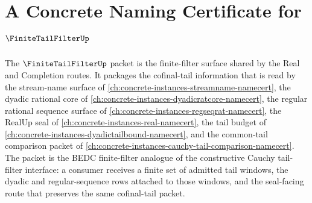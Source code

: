 \chapter{A Concrete Naming Certificate for $\FiniteTailFilterUp$}
\label{ch:concrete-instances-finite-tail-filter-namecert}

The $\FiniteTailFilterUp$ packet is the finite-filter surface shared by the Real and Completion routes. It packages the cofinal-tail information that is read by the stream-name surface of \autoref{ch:concrete-instances-streamname-namecert}, the dyadic rational core of \autoref{ch:concrete-instances-dyadicratcore-namecert}, the regular rational sequence surface of \autoref{ch:concrete-instances-regseqrat-namecert}, the RealUp seal of \autoref{ch:concrete-instances-real-namecert}, the tail budget of \autoref{ch:concrete-instances-dyadictailbound-namecert}, and the common-tail comparison packet of \autoref{ch:concrete-instances-cauchy-tail-comparison-namecert}. The packet is the BEDC finite-filter analogue of the constructive Cauchy tail-filter interface: a consumer receives a finite set of admitted tail windows, the dyadic and regular-sequence rows attached to those windows, and the seal-facing route that preserves the same cofinal-tail packet.

